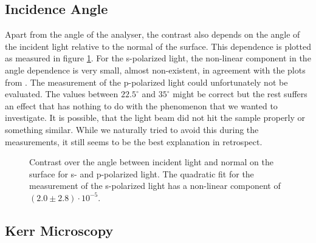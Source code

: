 \documentclass[a4paper]{scrartcl}
\numberwithin{equation}{section}
\numberwithin{figure}{section}
\numberwithin{table}{section}
\begin{document}
\subsection{Incidence Angle}
Apart from the angle of the analyser, the contrast also depends on the angle of the incident light relative to the normal of the surface. This dependence is plotted as measured in figure \ref{fig:inc}. For the s-polarized light, the non-linear component in the angle dependence is very small, almost non-existent, in agreement with the plots from \cite{paper}. The measurement of the p-polarized light could unfortunately not be evaluated. The values between $22.5^\circ$ and $35^\circ$ might be correct but the rest suffers an effect that has nothing to do with the phenomenon that we wanted to investigate. It is possible, that the light beam did not hit the sample properly or something similar. While we naturally tried to avoid this during the measurements, it still seems to be the best explanation in retrospect.
\begin{figure} 
 \centering
{}

\caption{
\small Contrast over the angle between incident light and normal on the surface for s- and p-polarized light. The quadratic fit for the measurement of the s-polarized light has a non-linear component of $(2.0\pm2.8)\cdot 10^{-5}$. } 
	\label{fig:inc}
\end{figure}


\FloatBarrier


\subsection{Kerr Microscopy}
\end{document}
